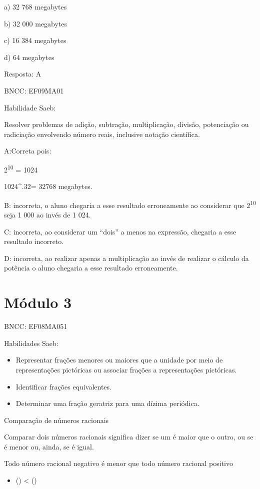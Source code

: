 a) 32 768 megabytes

b) 32 000 megabytes

c) 16 384 megabytes

d) 64 megabytes

Resposta: A

BNCC: EF09MA01

Habilidade Saeb:

Resolver problemas de adição, subtração, multiplicação, divisão,
potenciação ou radiciação envolvendo número reais, inclusive notação
científica.

A:Correta pois:

2\textsuperscript{10} = 1024

1024^{.}32= 32768 megabytes.

B: incorreta, o aluno chegaria a esse resultado erroneamente ao
considerar que 2\textsuperscript{10} seja 1 000 ao invés de 1 024.

C: incorreta, ao considerar um ``dois'' a menos na expressão, chegaria a
esse resultado incorreto.

D: incorreta, ao realizar apenas a multiplicação ao invés de realizar o
cálculo da potência o aluno chegaria a esse resultado erroneamente.

\section{Módulo 3}

BNCC: EF08MA051

Habilidades Saeb:

\begin{itemize}
\item
  Representar frações menores ou maiores que a unidade por meio de
  representações pictóricas ou associar frações a representações
  pictóricas.
\item
  Identificar frações equivalentes.
\item
  Determinar uma fração geratriz para uma dízima periódica.
\end{itemize}

Comparação de números racionais

Comparar dois números racionais significa dizer se um é maior que o
outro, ou se é menor ou, ainda, se é igual.

Todo número racional negativo é menor que todo número racional positivo

\begin{itemize}
\tightlist
\item
  () \textless{} ()
\end{itemize}

